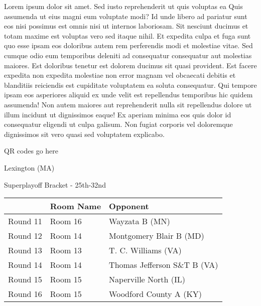 \documentclass{article}%
\begin{document}
\vspace*{8pt}%
\linebreak%
\newline%
\newline%
    Lorem ipsum dolor sit amet. Sed iusto reprehenderit ut quis voluptas ea Quis assumenda ut eius magni eum voluptate modi? Id unde libero ad pariatur sunt eos nisi possimus est omnis nisi ut internos laboriosam. Sit nesciunt ducimus et totam maxime est voluptas vero sed itaque nihil. Et expedita culpa et fuga sunt quo esse ipsam eos doloribus autem rem perferendis modi et molestiae vitae.\newline%
\newline%
    Sed cumque odio eum temporibus deleniti ad consequatur consequatur aut molestias maiores. Est doloribus tenetur est dolorem ducimus sit quasi provident. Est facere expedita non expedita molestiae non error magnam vel obcaecati debitis et blanditiis reiciendis est cupiditate voluptatem ea soluta consequatur. Qui tempore ipsam eos asperiores aliquid ex unde velit est repellendus temporibus hic quidem assumenda!\newline%
\newline%
    Non autem maiores aut reprehenderit nulla sit repellendus dolore ut illum incidunt ut dignissimos eaque! Ex aperiam minima eos quis dolor id consequatur eligendi ut culpa galisum. Non fugiat corporis vel doloremque dignissimos sit vero quasi sed voluptatem explicabo.\newline%
\newline%
\vspace*{30pt}%
\begin{center}%
\begin{Huge}%
QR codes go here%
\end{Huge}%
\end{center}%
\newpage%
\begin{center}%
\begin{Huge}%
Lexington (MA)%
\end{Huge}%
\vspace*{8pt}%
\linebreak%
\begin{Large}%
Superplayoff Bracket {-} 25th{-}32nd%
\end{Large}%
\end{center}%
%
\begin{tabularx}{\textwidth}{|c|Y|Y|}%
\hline%
&Room Name&Opponent\\%
\hline%
Round 11&Room 16&Wayzata B (MN)\\%
Round 12&Room 14&Montgomery Blair B (MD)\\%
Round 13&Room 13&T. C. Williams (VA)\\%
Round 14&Room 14&Thomas Jefferson S\&T B (VA)\\%
Round 15&Room 15&Naperville North (IL)\\%
Round 16&Room 15&Woodford County A (KY)\\%
\hline%
\end{tabularx}%
\end{document}
